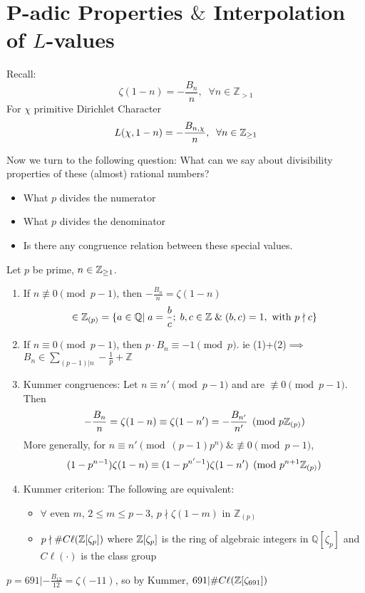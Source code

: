 \section{P-adic Properties $\&$ Interpolation of $L$-values}
Recall: 
\[
    \zeta(1-n)=-\frac{B_n}{n}, \;\; \forall n\in\mathbb{Z}_{>1}
\]
For $\chi$ primitive Dirichlet Character 
\[
    L(\chi, 1-n)=-\frac{B_{n,\chi}}{n},\;\; \forall n\in\mathbb{Z}_{\geq 1}  
\]

Now we turn to the following question: What can we say about divisibility properties of 
these (almost) rational numbers?
\begin{itemize}
    \item What $p$ divides the numerator
    \item What $p$ divides the denominator
    \item Is there any congruence relation between these special values.
\end{itemize}

\begin{theorem}
    Let $p$ be prime, $n\in\mathbb{Z}_{\geq 1}$. 
    \begin{enumerate}
        \item If $n\not\equiv 0 \pmod{p-1}$, then $-\frac{B_n}{n}=\zeta(1-n)$ \[\in\mathbb{Z}_{(p)}
        = \{a\in\mathbb{Q} |\; a=\frac{b}{c};\; b,c\in\mathbb{Z}\;\&\; (b,c)=1, \text{ with } p\nmid c\}\]
        \item If $n\equiv 0 \pmod{p-1}$, then $p\cdot B_n\equiv -1 \pmod{p}$. ie (1)+(2)$\implies$
        $B_n\in\sum_{(p-1)|n}-\frac{1}{p}+\mathbb{Z}$
        \item Kummer congruences: Let $n\equiv n' \pmod{p-1}$ and are $\not\equiv 0\pmod{p-1}$. Then 
        \[-\frac{B_n}{n}=\zeta(1-n)\equiv \zeta(1-n')=-\frac{B_{n'}}{n'} \pmod{p\mathbb{Z}_{(p)}}\]
        More generally, for 
        $n\equiv n' \pmod{(p-1)p^n} \;\& \not\equiv 0 \pmod{p-1}$, 
        \[(1-p^{n-1})\zeta(1-n)\equiv (1-p^{n'-1})\zeta(1-n')\pmod{p^{n+1}\mathbb{Z}_{(p)}}\]
        \item Kummer criterion: The following are equivalent: 
        \begin{itemize}
            \item $\forall$ even $m$, $2\leq m \leq p-3$, $p\nmid\zeta(1-m)$ in $\mathbb{Z}_{(p)}$
            \item $p\nmid \# C\ell(\mathbb{Z}[\zeta_p])$ where $\mathbb{Z}[\zeta_p]$ is the ring of algebraic integers in 
            $\mathbb{Q}[\zeta_p]$ and $C\ell(\cdot)$ is the class group
        \end{itemize}
    \end{enumerate}
\end{theorem}
\begin{example}
    $p=691 | -\frac{B_{12}}{12}=\zeta(-11)$, so by Kummer, $691|\# C\ell(\mathbb{Z}[\zeta_{691}])$
\end{example}

